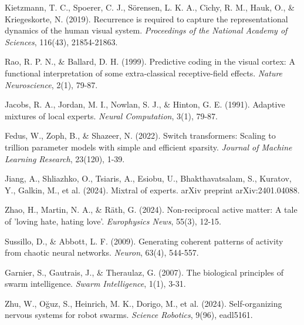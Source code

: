 \documentclass[11pt,a4paper,twocolumn]{article}
\begin{document}
\begin{thebibliography}{19}
 Kietzmann, T. C., Spoerer, C. J., Sörensen, L. K. A., Cichy, R. M., Hauk, O., \& Kriegeskorte, N. (2019). Recurrence is required to capture the representational dynamics of the human visual system. \textit{Proceedings of the National Academy of Sciences}, 116(43), 21854-21863.

 Rao, R. P. N., \& Ballard, D. H. (1999). Predictive coding in the visual cortex: A functional interpretation of some extra-classical receptive-field effects. \textit{Nature Neuroscience}, 2(1), 79-87.

 Jacobs, R. A., Jordan, M. I., Nowlan, S. J., \& Hinton, G. E. (1991). Adaptive mixtures of local experts. \textit{Neural Computation}, 3(1), 79-87.

 Fedus, W., Zoph, B., \& Shazeer, N. (2022). Switch transformers: Scaling to trillion parameter models with simple and efficient sparsity. \textit{Journal of Machine Learning Research}, 23(120), 1-39.

 Jiang, A., Shliazhko, O., Tsiaris, A., Esiobu, U., Bhakthavatsalam, S., Kuratov, Y., Galkin, M., et al. (2024). Mixtral of experts. arXiv preprint arXiv:2401.04088.

 Zhao, H., Martin, N. A., \& Räth, G. (2024). Non-reciprocal active matter: A tale of 'loving hate, hating love'. \textit{Europhysics News}, 55(3), 12-15.

 Sussillo, D., \& Abbott, L. F. (2009). Generating coherent patterns of activity from chaotic neural networks. \textit{Neuron}, 63(4), 544-557.

 Garnier, S., Gautrais, J., \& Theraulaz, G. (2007). The biological principles of swarm intelligence. \textit{Swarm Intelligence}, 1(1), 3-31.

 Zhu, W., Oğuz, S., Heinrich, M. K., Dorigo, M., et al. (2024). Self-organizing nervous systems for robot swarms. \textit{Science Robotics}, 9(96), eadl5161.
\end{thebibliography}
\end{document}
